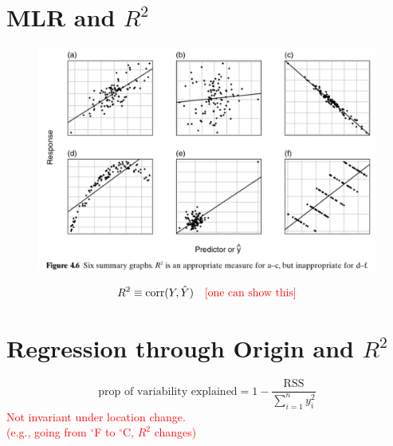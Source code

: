 \documentclass[14pt]{extarticle}
\begin{document}
\newpage

\section*{MLR and $R^2$}
\begin{figure}[H]
    \centering
    \includegraphics[width=1\textwidth]{fig7.png}
\end{figure}
\[
R^2 \equiv \text{corr}(Y, \hat{Y})
\quad \text{\textcolor{red}{[one can show this]}}
\]

\section*{Regression through Origin and $R^2$}

\noindent
\[
\text{prop of variability explained} = 1 - \frac{\text{RSS}}{\sum_{i=1}^{n} y_i^2}
\]
\textcolor{red}{Not invariant under location change.}\\
\textcolor{red}{(e.g., going from $^\circ$F to $^\circ$C, $R^2$ changes)}\\
\text{\textcolor{blue}{$\therefore R^2$ use here not recommended.}}
\end{document}
